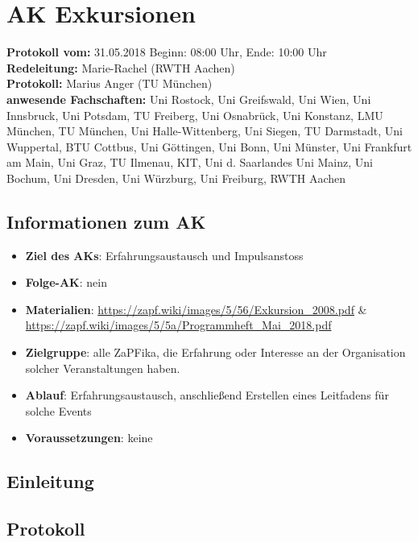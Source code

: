 
\section{AK Exkursionen}

  \textbf{Protokoll vom:} 31.05.2018
  Beginn: 08:00 Uhr,
  Ende: 10:00 Uhr \\
  \textbf{Redeleitung:} Marie-Rachel (RWTH Aachen) \\
  \textbf{Protokoll:} Marius Anger (TU München) \\
  \textbf{anwesende Fachschaften:} Uni Rostock, Uni Greifswald, Uni Wien, Uni Innsbruck, Uni Potsdam, TU Freiberg, Uni Osnabrück, Uni Konstanz, LMU München, TU München, Uni Halle-Wittenberg, Uni Siegen, TU Darmstadt, Uni Wuppertal, BTU Cottbus, Uni Göttingen, Uni Bonn, Uni Münster, Uni Frankfurt am Main, Uni Graz, TU Ilmenau, KIT, Uni d. Saarlandes Uni Mainz, Uni Bochum, Uni Dresden, Uni Würzburg, Uni Freiburg, RWTH Aachen

  \subsection*{Informationen zum AK}
    \begin{itemize}
    	\item \textbf{Ziel des AKs}: Erfahrungsaustausch und Impulsanstoss
    	\item \textbf{Folge-AK}: nein
      \item \textbf{Materialien}: \url{https://zapf.wiki/images/5/56/Exkursion_2008.pdf} \& \url{https://zapf.wiki/images/5/5a/Programmheft_Mai_2018.pdf}
    	\item \textbf{Zielgruppe}: alle ZaPFika, die Erfahrung oder Interesse an der Organisation solcher Veranstaltungen haben.
    	\item \textbf{Ablauf}: Erfahrungsaustausch, anschließend Erstellen eines Leitfadens für solche Events
    	\item \textbf{Voraussetzungen}: keine
    \end{itemize}

  \subsection*{Einleitung}

  \subsection*{Protokoll}
